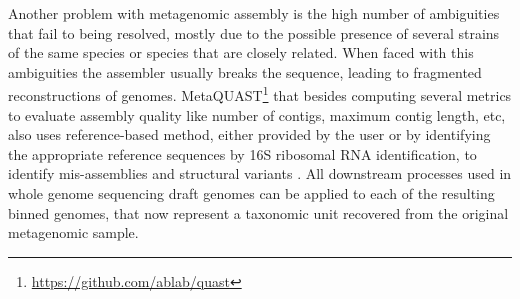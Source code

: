 Another problem with metagenomic assembly is the high number of ambiguities that fail to being resolved, mostly due to the possible presence of several strains of the same species or species that are closely related. When faced with this ambiguities the assembler usually breaks the sequence, leading to fragmented reconstructions of genomes. MetaQUAST\footnote{\url{https://github.com/ablab/quast}} that besides computing several metrics to evaluate assembly quality like number of contigs, maximum contig length, etc, also uses reference-based method, either provided by the user or by identifying the appropriate reference sequences by 16S ribosomal RNA identification, to identify mis-assemblies and structural variants \citep{mikheenko_metaquast_2016}. All downstream processes used in whole genome sequencing draft genomes can be applied to each of the resulting binned genomes, that now represent a taxonomic unit recovered from the original metagenomic sample. 
